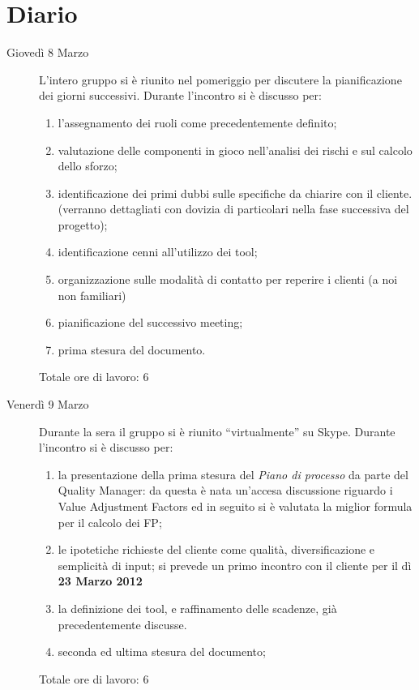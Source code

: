 \section{Diario}
\begin{description}
\item[Giovedì 8 Marzo] L'intero gruppo si è riunito nel pomeriggio per discutere 
	la pianificazione dei giorni successivi. Durante l'incontro si è discusso
	per:
\begin{enumerate}
\item l'assegnamento dei ruoli come precedentemente definito;
\item valutazione delle componenti in gioco nell'analisi dei rischi e sul calcolo
	dello sforzo;
\item identificazione dei primi dubbi sulle specifiche da chiarire con il cliente.
	(verranno dettagliati con dovizia di particolari nella fase successiva 
	del progetto);
\item identificazione cenni all'utilizzo dei tool;
\item organizzazione sulle modalità di contatto per reperire i clienti (a noi 
	non familiari)
\item pianificazione del successivo meeting;
\item prima stesura del documento.
\end{enumerate}
Totale ore di lavoro: 6
\item[Venerdì 9 Marzo] Durante la sera il gruppo si è riunito ``virtualmente'' 
	su Skype. Durante l'incontro si è discusso per:
\begin{enumerate}
\item la presentazione della prima stesura del \textit{Piano di processo} da parte del Quality Manager:
	da questa è nata un'accesa discussione riguardo i Value Adjustment Factors
	ed in seguito si è valutata la miglior formula per il calcolo dei FP;
\item le ipotetiche richieste del cliente 
	come qualità, diversificazione e semplicità di input; si prevede un 
	primo incontro con il cliente per il dì \textbf{23 Marzo 2012}
\item la definizione dei tool, e raffinamento delle scadenze, già precedentemente discusse.
\item seconda ed ultima stesura del documento;
\end{enumerate}
Totale ore di lavoro: 6
\end{description}
